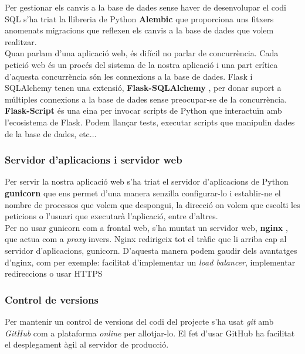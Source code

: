 	Per gestionar els canvis a la base de dades sense haver de desenvolupar el codi \ac{SQL} s'ha triat la llibreria de Python \textbf{Alembic} \cite{alembic} que proporciona uns fitxers anomenats migracions que reflexen els canvis a la base de dades que volem realitzar.\\

	Quan parlam d'una aplicació web, és difícil no parlar de concurrència. Cada petició web és un procés del sistema de la nostra aplicació i una part crítica d'aquesta concurrència són les connexions a la base de dades. Flask i SQLAlchemy tenen una extensió, \textbf{Flask-SQLAlchemy} \cite{flask_sqlalchemy}, per donar suport a múltiples connexions a la base de dades sense preocupar-se de la concurrència. \\

	\textbf{Flask-Script} \cite{flask_script} és una eina per invocar scripts de Python que interactuïn amb l'ecosistema de Flask. Podem llançar tests, executar scripts que manipulin dades de la base de dades, etc...\\
	

	\subsubsection{Servidor d'aplicacions i servidor web}
	
	Per servir la nostra aplicació web s'ha triat el servidor d'aplicacions de Python \textbf{gunicorn} \cite{gunicorn} que ens permet d'una manera senzilla configurar-lo i establir-ne el nombre de processos que volem que despongui, la direcció on volem que escolti les peticions o l'usuari que executarà l'aplicació, entre d'altres.\\

	Per no usar gunicorn com a frontal web, s'ha muntat un servidor web, \textbf{nginx} \cite{nginx}, que actua com a \emph{proxy} invers. Nginx redirigeix tot el tràfic que li arriba cap al servidor d'aplicacions, gunicorn. D'aquesta manera podem gaudir dels avantatges d'nginx, com per exemple: facilitat d'implementar un \emph{load balancer}, implementar redireccions o usar \ac{HTTPS}

	\subsubsection{Control de versions}
	Per mantenir un control de versions del codi del projecte s'ha usat \emph{git} \cite{git} amb \emph{GitHub} \cite{github} com a plataforma \emph{online} per allotjar-lo. El fet d'usar GitHub ha facilitat el desplegament àgil al servidor de producció.
	

